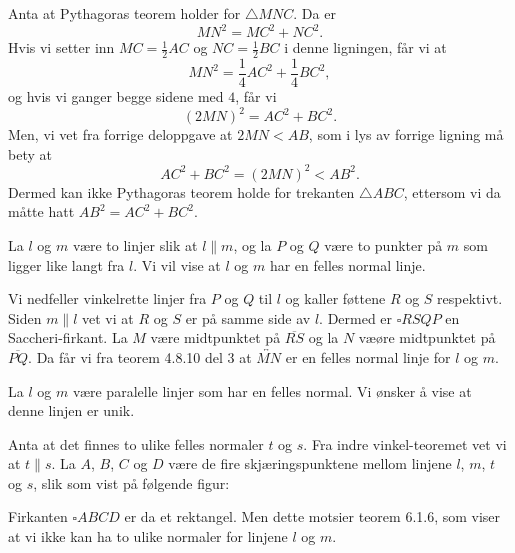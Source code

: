 \begin{oppgave}[6.1.5]
    \begin{punkt}
        Anta at Pythagoras teorem holder for $\triangle MNC$. 
        Da er 
        $$MN^2=MC^2+NC^2.$$
        Hvis vi setter inn $MC=\frac{1}{2}AC$ og $NC=\frac{1}{2}BC$ i denne ligningen, får vi at 
        $$MN^2 = \frac{1}{4}AC^2+\frac{1}{4}BC^2,$$
        og hvis vi ganger begge sidene med $4$, får vi 
        $$(2MN)^2=AC^2+BC^2.$$
        Men, vi vet fra forrige deloppgave at $2MN<AB$, som i lys av forrige ligning må bety at 
        $$AC^2+BC^2= (2MN)^2<AB^2.$$
        Dermed kan ikke Pythagoras teorem holde for trekanten $\triangle ABC$, ettersom vi da måtte hatt $AB^2=AC^2+BC^2$.
    \end{punkt}
\end{oppgave}

\begin{oppgave}[6.2.1]
    La $l$ og $m$ være to linjer slik at $l\parallel m$, og la $P$ og $Q$ være to punkter på $m$ som ligger like langt fra $l$. 
    Vi vil vise at $l$ og $m$ har en felles normal linje. 

    Vi nedfeller vinkelrette linjer fra $P$ og $Q$ til $l$ og kaller føttene $R$ og $S$ respektivt.
    Siden $m\parallel l$ vet vi at $R$ og $S$ er på samme side av $l$. 
    Dermed er $\square RSQP$ en Saccheri-firkant. 
    La $M$ være midtpunktet på $\overline{RS}$ og la $N$ væøre midtpunktet på $\overline{PQ}$. 
    Da får vi fra teorem 4.8.10 del 3 at $\overleftrightarrow{MN}$ er en felles normal linje for $l$ og $m$. 

    \begin{figure}[H]
        \centering
         
    \end{figure}
\end{oppgave}

\begin{oppgave}[6.2.2]
    La $l$ og $m$ være paralelle linjer som har en felles normal. 
    Vi ønsker å vise at denne linjen er unik. 

    Anta at det finnes to ulike felles normaler $t$ og $s$. 
    Fra indre vinkel-teoremet vet vi at $t\parallel s$. 
    La $A$, $B$, $C$ og $D$ være de fire skjæringspunktene mellom linjene $l$, $m$, $t$ og $s$, slik som vist på følgende figur: 

    \begin{figure}[H]
        \centering
         
    \end{figure}
    
    Firkanten $\square ABCD$ er da et rektangel. 
    Men dette motsier teorem 6.1.6, som viser at vi ikke kan ha to ulike normaler for linjene $l$ og $m$. 
\end{oppgave}